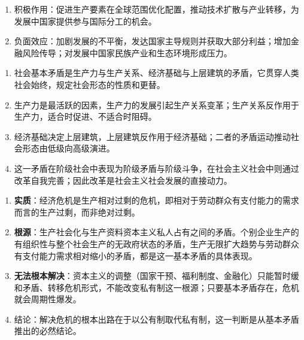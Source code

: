 \yaodian
\begin{enumerate}[label=(\arabic*),leftmargin=2.2em,itemsep=2pt,topsep=2pt]
\item 积极作用：促进生产要素在全球范围优化配置，推动技术扩散与产业转移，为发展中国家提供参与国际分工的机会。
\item 负面效应：加剧发展的不平衡，发达国家主导规则并获取大部分利益；增加金融风险传导；对发展中国家民族产业和生态环境形成压力。
\end{enumerate}


\yaodian
\begin{enumerate}[label=(\arabic*),leftmargin=2.2em,itemsep=2pt,topsep=2pt]
\item 社会基本矛盾是生产力与生产关系、经济基础与上层建筑的矛盾，它贯穿人类社会始终，规定社会形态的性质和更替。
\item 生产力是最活跃的因素，生产力的发展引起生产关系变革；生产关系反作用于生产力，适合时促进、不适合时阻碍。
\item 经济基础决定上层建筑，上层建筑反作用于经济基础；二者的矛盾运动推动社会形态由低级向高级演进。
\item 这一矛盾在阶级社会中表现为阶级矛盾与阶级斗争，在社会主义社会中则通过改革自我完善；因此改革是社会主义社会发展的直接动力。
\end{enumerate}

\yaodian
\begin{enumerate}[label=(\arabic*),leftmargin=2.2em,itemsep=2pt,topsep=2pt]
\item \textbf{实质}：经济危机是生产相对过剩的危机，即相对于劳动群众有支付能力的需求而言的生产过剩，而非绝对过剩。
\item \textbf{根源}：生产社会化与生产资料资本主义私人占有之间的矛盾。个别企业生产的有组织性与整个社会生产的无政府状态的矛盾，生产无限扩大趋势与劳动群众有支付能力需求相对缩小的矛盾，都是这一基本矛盾的具体表现。
\item \textbf{无法根本解决}：资本主义的调整（国家干预、福利制度、金融化）只能暂时缓和矛盾、转移危机形式，不能改变私有制这一根源；只要基本矛盾存在，危机就会周期性爆发。
\item 结论：解决危机的根本出路在于以公有制取代私有制，这一判断是从基本矛盾推出的必然结论。
\end{enumerate}


